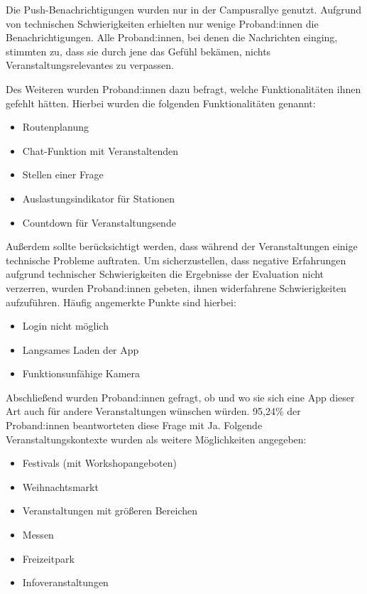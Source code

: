 Die Push-Benachrichtigungen wurden nur in der Campusrallye genutzt. Aufgrund von
technischen Schwierigkeiten erhielten nur wenige Proband:innen die
Benachrichtigungen. Alle Proband:innen, bei denen die Nachrichten einging,
stimmten zu, dass sie durch jene das Gefühl bekämen, nichts
Veranstaltungsrelevantes zu verpassen.

Des Weiteren wurden Proband:innen dazu befragt, welche
Funktionalitäten ihnen gefehlt hätten. Hierbei wurden die folgenden
Funktionalitäten genannt:

\begin{itemize}[label=\bullet]
    \item Routenplanung
    \item Chat-Funktion mit Veranstaltenden
    \item Stellen einer Frage
    \item Auslastungsindikator für Stationen
    \item Countdown für Veranstaltungsende
\end{itemize}

Außerdem sollte berücksichtigt werden, dass während der Veranstaltungen einige
technische Probleme auftraten. Um sicherzustellen, dass negative Erfahrungen
aufgrund technischer Schwierigkeiten die Ergebnisse der Evaluation nicht
verzerren, wurden Proband:innen gebeten, ihnen widerfahrene Schwierigkeiten
aufzuführen. Häufig angemerkte Punkte sind hierbei:

\begin{itemize}[label=\bullet]
    \item Login nicht möglich
    \item Langsames Laden der App
    \item Funktionsunfähige Kamera
\end{itemize}

Abschließend wurden Proband:innen gefragt, ob und wo sie sich eine App dieser
Art auch für andere Veranstaltungen wünschen würden. 95,24\% der Proband:innen
beantworteten diese Frage mit Ja. Folgende Veranstaltungskontexte
wurden als weitere Möglichkeiten angegeben:

\begin{itemize}[label=\bullet]
    \item Festivals (mit Workshopangeboten)
    \item Weihnachtsmarkt
    \item Veranstaltungen mit größeren Bereichen
    \item Messen
    \item Freizeitpark
    \item Infoveranstaltungen
\end{itemize}


